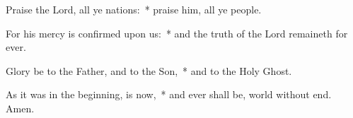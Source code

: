 \begin{enpars}
\item Praise the Lord, all ye nations:~* praise him, all ye people.
\item For his mercy is confirmed upon us:~* and the truth of the Lord remaineth for ever.
\item Glory be to the Father, and to the Son,~* and to the Holy Ghost.
\item As it was in the beginning, is now,~* and ever shall be, world without end. Amen.
\end{enpars}